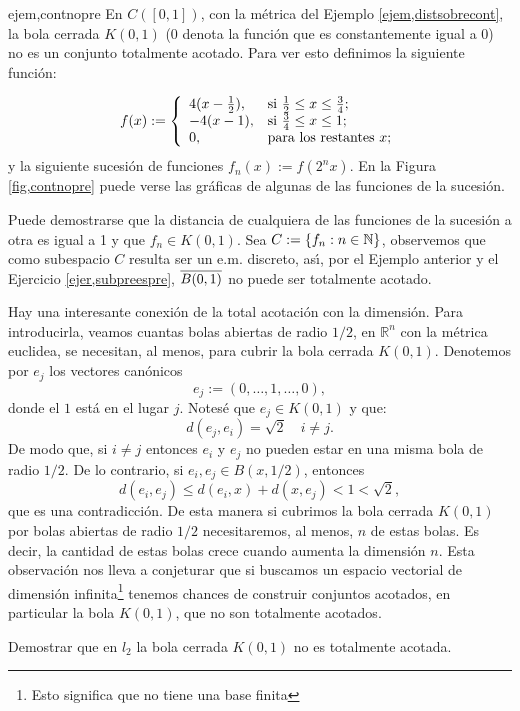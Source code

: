 \begin{ejemplo}{ejem,contnopre} En $C([0,1])$, con la métrica
 del Ejemplo
\vref{ejem,distsobrecont}, la bola cerrada $K(0,1)$ (0 denota la
función que es constantemente igual a 0) no es un conjunto
totalmente acotado. Para ver esto definimos la siguiente
función:

\[
	f(x):=\left\{%
\begin{array}{ll}
	4(x-\frac12), & \hbox{si $\frac12\leq x\leq \frac34$;} \\
	-4(x-1), & \hbox{si $\frac34\leq x\leq 1$;} \\
	0, & \hbox{para los restantes $x$;} \\
\end{array}
\right.
\]
y la siguiente sucesión de funciones $f_n(x):=f(2^nx)$. En la
Figura \ref{fig,contnopre} puede verse las gráficas de algunas
de las funciones de la sucesión.


Puede demostrarse que la distancia de cualquiera de las funciones
de la sucesión a otra es igual a 1 y que $f_n\in K(0,1)$. Sea
$C:=\{f_n:n\in\mathbb{N}\}$, observemos que como subespacio $C$ resulta
ser un e.m. discreto, as\'{\i}, por el Ejemplo anterior y el
Ejercicio \vref{ejer,subpreespre}, $\overline{B(0,1)}$ no puede ser
totalmente acotado.
\end{ejemplo}

\begin{ejemplo}{} Hay una interesante conexión de la total
acotación con la dimensión. Para introducirla, veamos
 cuantas bolas abiertas de radio
$1/2$, en $\mathbb{R}^n$ con la métrica euclidea,
se necesitan, al menos,  para cubrir la bola cerrada $K(0,1)$.
Denotemos por $e_j$ los vectores canónicos
\[
	e_j:=(0,\ldots,1,\ldots,0),
\]
donde el $1$ está en el lugar $j$. Notesé que $e_j\in K(0,1)$ y que:
\[
	d(e_j,e_i)=\sqrt{2}\quad i\neq j.
\]
De modo que, si $i\neq j$ entonces $e_i$ y $e_j$ no pueden estar
en una misma bola de radio $1/2$. De lo contrario, si $e_i,e_j\in
B(x,1/2)$, entonces
\[
	d(e_i,e_j)\leq d(e_i,x)+d(x,e_j)<1<\sqrt{2},
\]
que es una contradicción. De esta manera si cubrimos la bola cerrada
$K(0,1)$ por bolas abiertas de radio $1/2$ necesitaremos, al menos,
$n$ de estas bolas. Es decir, la cantidad de estas bolas crece cuando aumenta
la dimensión $n$. Esta observación nos lleva a conjeturar que si
buscamos un espacio vectorial de dimensión infinita\footnote{Esto significa
que no tiene una base finita} tenemos chances de construir conjuntos acotados,
en particular la bola $K(0,1)$, que no son totalmente acotados.

\begin{ejercicio}{} Demostrar que en $l_2$ la bola cerrada $K(0,1)$
no es totalmente acotada.
\end{ejercicio}
\end{ejemplo}


